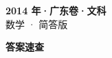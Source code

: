 \documentclass[zihao=-4, a4paper]{ctexart}
\begin{document}
\begin{center}
  {\Large\bfseries 2014 年·广东卷·文科}\\[4pt]
  {\large 数学 · 简答版}
\end{center}
\medskip
{}

\clearpage
{}
\begin{center}{\Large\bfseries 答案速查}\end{center}
\medskip

\end{document}
